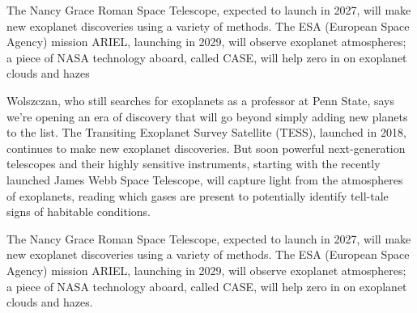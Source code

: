 
The Nancy Grace Roman Space Telescope, expected to launch in 2027, will make new exoplanet discoveries using a variety of methods. The ESA (European Space Agency) mission ARIEL, launching in 2029, will observe exoplanet atmospheres; a piece of NASA technology aboard, called CASE, will help zero in on exoplanet clouds and hazes








Wolszczan, who still searches for exoplanets as a professor at Penn State, says we’re opening an era of discovery that will go beyond simply adding new planets to the list. The Transiting Exoplanet Survey Satellite (TESS), launched in 2018, continues to make new exoplanet discoveries. But soon powerful next-generation telescopes and their highly sensitive instruments, starting with the recently launched James Webb Space Telescope, will capture light from the atmospheres of exoplanets, reading which gases are present to potentially identify tell-tale signs of habitable conditions.

The Nancy Grace Roman Space Telescope, expected to launch in 2027, will make new exoplanet discoveries using a variety of methods. The ESA (European Space Agency) mission ARIEL, launching in 2029, will observe exoplanet atmospheres; a piece of NASA technology aboard, called CASE, will help zero in on exoplanet clouds and hazes.


